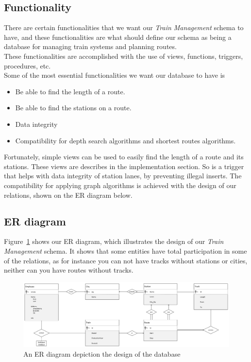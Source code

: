 \subsection{Functionality}
There are certain functionalities that we want our \emph{Train Management} schema to have, and these functionalities are what should define our schema as being a database for managing train systems and planning routes.\\[12pt]
These functionalities are accomplished with the use of views, functions, triggers, procedures, etc.\\
Some of the most essential functionalities we want our database to have is
\begin{itemize}
\item Be able to find the length of a route.
\item Be able to find the stations on a route.
\item Data integrity
\item Compatibility for depth search algorithms and shortest routes algorithms.
\end{itemize}

Fortunately, simple views can be used to easily find the length of a route and its stations. These views are describes in the implementation section. So is a trigger that helps with data integrity of station lanes, by preventing illegal inserts. The compatibility for applying graph algorithms is achieved with the design of our relations, shown on the ER diagram below.

\subsection{ER diagram}
Figure~\ref{fig:ER} shows our ER diagram, which illustrates the design of our 
\emph{Train Management} schema. It shows that some entities have total 
participation in some of the relations, as for instance you can not have tracks 
without stations or cities, neither can you have routes without tracks.

\begin{figure}[ht!]
    \centering
    \includegraphics[angle=90,origin=c,width=.45\textwidth]{img/Handwritten_ER}
    \caption{An ER diagram depiction the design of the database}
    \label{fig:ER}
\end{figure}

